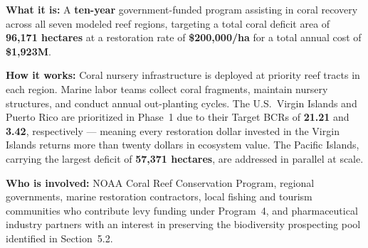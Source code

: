 \documentclass[10pt,letterpaper]{article}
\begin{document}
\begin{tcolorbox}[title=Program 1: Coral Reef Restoration --- \$1{,}923M Annual Total,
  colback=blue!5, colframe=blue!50!black, fonttitle=\bfseries, breakable]

  \textbf{What it is:} A \textbf{ten-year} government-funded program assisting in coral recovery
  across all seven modeled reef regions, targeting a total coral deficit area of
  \textbf{96,171 hectares} at a restoration rate of \textbf{\$200,000/ha} for a total annual cost
  of \textbf{\$1,923M}.

  \medskip
  \textbf{How it works:} Coral nursery infrastructure is deployed at priority reef tracts in each
  region. Marine labor teams collect coral fragments, maintain nursery structures, and conduct
  annual out-planting cycles. The U.S.\ Virgin Islands and Puerto Rico are prioritized in
  Phase~1 due to their Target BCRs of \textbf{21.21} and \textbf{3.42}, respectively --- meaning
  every restoration dollar invested in the Virgin Islands returns more than twenty dollars in
  ecosystem value. The Pacific Islands, carrying the largest deficit of \textbf{57,371 hectares},
  are addressed in parallel at scale.

  \medskip
  \textbf{Who is involved:} NOAA Coral Reef Conservation Program, regional governments, marine
  restoration contractors, local fishing and tourism communities who contribute levy funding under
  Program~4, and pharmaceutical industry partners with an interest in preserving the
  biodiversity prospecting pool identified in Section~5.2.


\end{tcolorbox}
\end{document}
